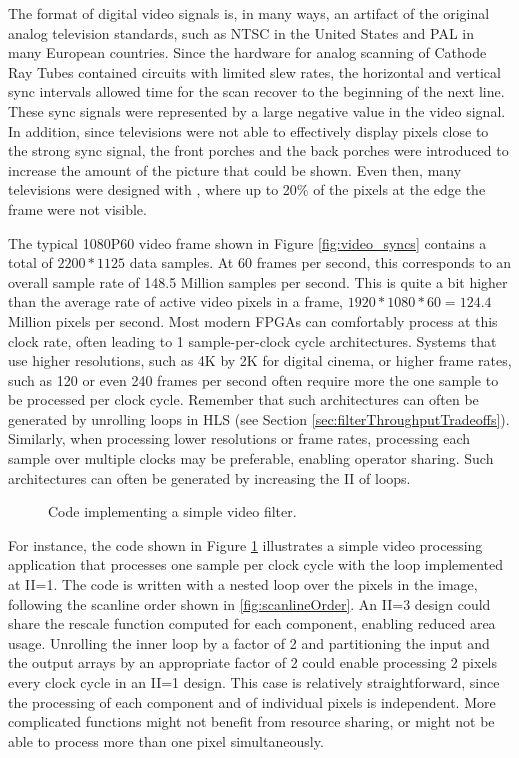 \begin{aside}
The format of digital video signals is, in many ways, an artifact of the original analog television standards, such as NTSC in the United States and PAL in many European countries.  Since the hardware for analog scanning of Cathode Ray Tubes contained  circuits with limited slew rates, the horizontal and vertical sync intervals allowed time for the scan recover to the beginning of the next line.  These sync signals were represented by a large negative value in the video signal.  In addition, since televisions were not able to effectively display pixels close to the strong sync signal, the front porches and the back porches were introduced to increase the amount of the picture that could be shown.  Even then, many televisions were designed with , where up to 20\% of the pixels at the edge the frame were not visible.
\end{aside}

The typical 1080P60 video frame shown in Figure \ref{fig:video_syncs} contains a total of $2200*1125$ data samples.  At 60 frames per second, this corresponds to an overall sample rate of 148.5 Million samples per second.   This is quite a bit higher than the average rate of active video pixels in a frame, $1920*1080*60 = 124.4$ Million pixels per second. Most modern FPGAs can comfortably process at this clock rate, often leading to 1 sample-per-clock cycle architectures.  Systems that use higher resolutions, such as 4K by 2K for digital cinema, or higher frame rates, such as 120 or even 240 frames per second often require more the one sample to be processed per clock cycle. Remember that such architectures can often be generated by unrolling loops in HLS (see Section \ref{sec:filterThroughputTradeoffs}).  Similarly, when processing lower resolutions or frame rates, processing each sample over multiple clocks may be preferable, enabling operator sharing.  Such architectures can often be generated by increasing the II of loops. %

\begin{figure}
{\scriptsize }
\caption{Code implementing a simple video filter.}\label{fig:videoSimple}
\end{figure}

For instance, the code shown in Figure \ref{fig:videoSimple} illustrates a simple video processing application that processes one sample per clock cycle with the loop implemented at II=1.  The code is written with a nested loop over the pixels in the image, following the scanline order shown in \ref{fig:scanlineOrder}.  An II=3 design could share the rescale function computed for each component, enabling reduced area usage.  Unrolling the inner loop by a factor of 2 and partitioning the input and the output arrays by an appropriate factor of 2 could enable processing 2 pixels every clock cycle in an II=1 design.  This case is relatively straightforward, since the processing of each component and of individual pixels is independent.  More complicated functions might not benefit from resource sharing, or might not be able to process more than one pixel simultaneously.

